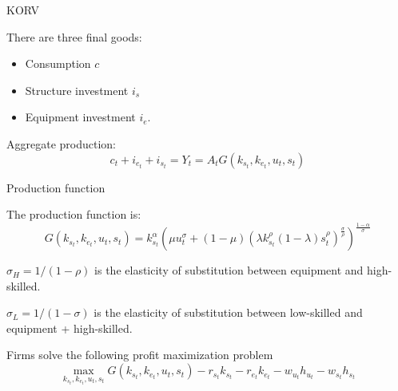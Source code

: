 \documentclass[notes,11pt, aspectratio=169]{beamer}
\newenvironment{wideitemize}{\itemize\addtolength{\itemsep}{10pt}}{\enditemize}
\begin{document}
\begin{frame}{KORV}
 \begin{wideitemize}
 \item There are three final goods:
 \begin{itemize}
 \item Consumption $c$
 \item Structure investment $i_s$
 \item Equipment investment $i_e$.
 \end{itemize}
 \item Aggregate production:
 \begin{equation}\label{eq:production}
 c_t + i_{e_t} + i_{s_t} = Y_t = A_t G(k_{s_t}, k_{e_t}, u_t, s_t)
 \end{equation}
 \end{wideitemize}
\end{frame}

\begin{frame}{Production function}
 \begin{wideitemize}
 \item The production function is:
 \begin{equation}\label{eq:production_fun}
 G(k_{s_t}, k_{e_t}, u_t, s_t) = k_{s_t}^\alpha\left( \mu u_t^\sigma + (1-\mu)\left(\lambda k_{s_t}^\rho (1-\lambda)s_t^\rho\right)^\frac{\sigma}{\rho}\right)^\frac{1-\alpha}{\sigma}
 \end{equation}
 \item $\sigma_{H} = 1/(1-\rho)$ is the elasticity of substitution between equipment and high-skilled.
 \item $\sigma_{L} = 1/(1-\sigma)$ is the elasticity of substitution between low-skilled and equipment + high-skilled.
 \item Firms solve the following profit maximization problem 
 \begin{equation}\label{eq:profit_max}
 \max_{k_{s_t}, k_{e_t}, u_t, s_t} G(k_{s_t}, k_{e_t}, u_t, s_t) - r_{s_t}k_{s_t} - r_{e_t}k_{e_t} - w_{u_t} h_{u_t} - w_{s_t} h_{s_t}
 \end{equation}
 \end{wideitemize}
\end{frame}
\end{document}
